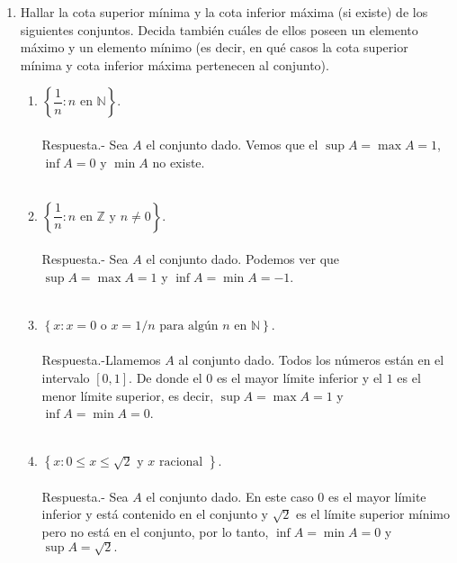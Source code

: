 \begin{enumerate}[\bfseries 1.]

    \item Hallar la cota superior mínima y la cota inferior máxima (si existe) de los siguientes conjuntos. Decida también cuáles de ellos poseen un elemento máximo y un elemento mínimo (es decir, en qué casos la cota superior mínima y cota inferior máxima pertenecen al conjunto).

	\begin{enumerate}[\bfseries (i)]

	    \item $\left\{ \dfrac{1}{n}: n\mbox{ en }\mathbb{N}\right\}$.\\\\
		Respuesta.-\; Sea $A$ el conjunto dado. Vemos que el $\sup A = \max A = 1$, $\inf A = 0$ y $\min A$ no existe.\\\\

	    \item $\left\{ \dfrac{1}{n}: n \mbox{ en } \mathbb{Z} \mbox{ y } n\neq 0\right\}$.\\\\
		Respuesta.-\; Sea $A$ el conjunto dado. Podemos ver que $\sup A = \max A = 1$ y $\inf A  = \min A = -1$.\\\\

	    \item $\left\{ x:x=0 \mbox{ o } x=1/n \mbox{ para algún } n \mbox{ en } \mathbb{N}\right\}$.\\\\
		Respuesta.-\;Llamemos $A$ al conjunto dado. Todos los números están en el intervalo $[0,1]$. De donde el $0$ es el mayor límite inferior y el $1$ es el menor límite superior, es decir,
		$\sup A = \max A = 1$ y $\inf A = \min A = 0$.\\\\

	    \item $\left\{ x:0\leq x \leq \sqrt{2} \mbox{ y } x \mbox{ racional }\right\}$.\\\\
		Respuesta.-\; Sea $A$ el conjunto dado. En este caso $0$ es el mayor límite inferior y está contenido en el conjunto y $\sqrt{2}$ es el límite superior mínimo pero no está en el conjunto, por lo tanto, $\inf A = \min A = 0$ y $\sup A = \sqrt{2}.$\\\\


\end{enumerate}
\end{enumerate}
